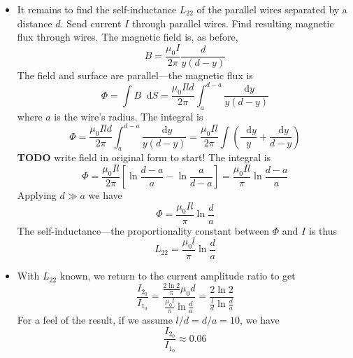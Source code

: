 \documentclass[11pt, a4paper]{article}
\newcommand{\diff}{\mathop{}\!\mathrm{d}} %
\renewcommand{\vec}[1]{\bm{#1}} %
\newcommand{\mm}{\mu_{0}}  %
\newcommand{\m}{\vec{m}} %
\begin{document}
\begin{itemize}
	\item It remains to find the self-inductance $ L_{22} $ of the parallel wires separated by a distance $ d $. Send current $ I $ through parallel wires. Find resulting magnetic flux through wires. The magnetic field is, as before,
	\begin{equation*}
		B = \frac{\mm I}{2\pi} \frac{d}{y(d-y)}
	\end{equation*}
	The field and surface are parallel---the magnetic flux is
	\begin{equation*}
		\Phi = \int B \diff S = \frac{\mm I l d}{2 \pi}\int_{a}^{d-a} \frac{\diff y}{y(d-y)}
	\end{equation*}
	where $ a $ is the wire's radius. The integral is 
	\begin{equation*}
		\Phi = \frac{\mm I l d}{2 \pi}\int_{a}^{d-a} \frac{\diff y}{y(d-y)} =  \frac{\mm I l}{2 \pi} \int \left(\frac{\diff y}{y} + \frac{\diff y}{d-y}\right)
	\end{equation*}
	\textbf{TODO} write field in original form to start! The integral is 
	\begin{equation*}
		\Phi = \frac{\mm I l}{2 \pi}\left[\ln \frac{d-a}{a} - \ln \frac{a}{d-a}\right] = \frac{\mm I l}{\pi} \ln \frac{d-a}{a}
	\end{equation*}
	Applying $ d \gg a $ we have
	\begin{equation*}
		\Phi = \frac{\mm I l}{\pi} \ln \frac{d}{a}
	\end{equation*}
	The self-inductance---the proportionality constant between $ \Phi $ and $ I $ is thus
	\begin{equation*}
		L_{22} = \frac{\mm l}{\pi}\ln \frac{d}{a}
	\end{equation*}
	
	\item With $ L_{22} $ known, we return to the current amplitude ratio to get
	\begin{equation*}
		\frac{I_{2_{0}}}{I_{1_{0}}} = \frac{\frac{2\ln 2}{\pi} \mm d}{\frac{\mm l}{\pi}\ln \frac{d}{a}} = \frac{2\ln 2}{\frac{l}{d} \ln \frac{d}{a}}
	\end{equation*}
	For a feel of the result, if we assume $ l/d = d/a = 10 $, we have 
	\begin{equation*}
		\frac{I_{2_{0}}}{I_{1_{0}}} \approx 0.06
	\end{equation*}
\end{itemize}
\end{document}
